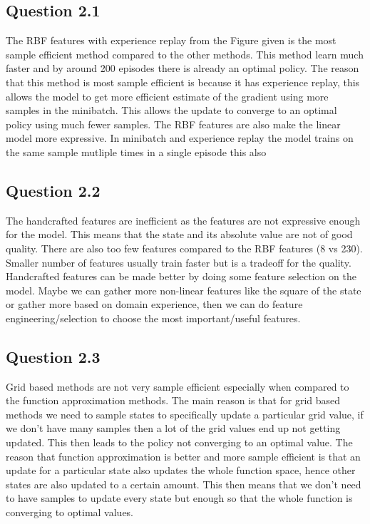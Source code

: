 \documentclass[a4paper]{article}
\begin{document}
\subsection*{Question 2.1}
The RBF features with experience replay from the Figure given is the most sample efficient method compared to the other methods. This method learn much faster and by around 200 episodes there is already an optimal policy. The reason that this method is most sample efficient is because it has experience replay, this allows the model to get more efficient estimate of the gradient using more samples in the minibatch. This allows the update to converge to an optimal policy using much fewer samples. The RBF features are also make the linear model more expressive. In minibatch and experience replay the model trains on the same sample mutliple times in a single episode this also   
\subsection*{Question 2.2}
The handcrafted features are inefficient as the features are not expressive enough for the model. This means that the state and its absolute value are not of good quality. There are also too few features compared to the RBF features (8 vs 230). Smaller number of features usually train faster but is a tradeoff for the quality. Handcrafted features can be made better by doing some feature selection on the model. Maybe we can gather more non-linear features like the square of the state or gather more based on domain experience, then we can do feature engineering/selection to choose the most important/useful features.
\subsection*{Question 2.3}
Grid based methods are not very sample efficient especially when compared to the function approximation methods. The main reason is that for grid based methods we need to sample states to specifically update a particular grid value, if we don't have many samples then a lot of the grid values end up not getting updated. This then leads to the policy not converging to an optimal value. The reason that function approximation is better and more sample efficient is that an update for a particular state also updates the whole function space, hence other states are also updated to a certain amount. This then means that we don't need to have samples to update every state but enough so that the whole function is converging to optimal values.
\end{document}
